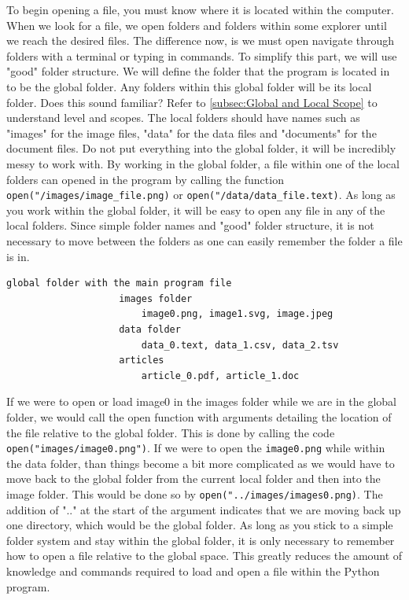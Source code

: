 \documentclass[11pt,a4paper]{book}
\begin{document}
				To begin opening a file, you must know where it is located within the computer. When we look for a file, we open folders and folders within some explorer until we reach the desired files. The difference now, is we must open navigate through folders with a terminal or typing in commands. To simplify this part, we will use "good" folder structure. We will define the folder that the program is located in to be the global folder. Any folders within this global folder will be its local folder. Does this sound familiar? Refer to \autoref{subsec:Global and Local Scope} to understand level and scopes. The local folders should have names such as "images" for the image files, "data" for the data files and "documents" for the document files. Do not put everything into the global folder, it will be incredibly messy to work with. By working in the global folder, a file within one of the local folders can opened in the program by calling the function \lstinline|open("/images/image_file.png)| or \lstinline|open("/data/data_file.text)|. As long as you work within the global folder, it will be easy to open any file in any of the local folders. Since simple folder names and "good" folder structure, it is not necessary to move between the folders as one can easily remember the folder a file is in.
				
				\begin{lstlisting}[caption= Cartoon of the directory structure]
				global folder with the main program file
					images folder
						image0.png, image1.svg, image.jpeg
					data folder
						data_0.text, data_1.csv, data_2.tsv
					articles
						article_0.pdf, article_1.doc
				\end{lstlisting}
				
				If we were to open or load image0 in the images folder while we are in the global folder, we would call the open function with arguments detailing the location of the file relative to the global folder. This is done by calling the code \lstinline|open("images/image0.png")|. If we were to open the \lstinline|image0.png| while within the data folder, than things become a bit more complicated as we would have to move back to the global folder from the current local folder and then into the image folder. This would be done so by  \lstinline|open("../images/images0.png)|. The addition of ".." at the start of the argument indicates that we are moving back up one directory, which would be the global folder. As long as you stick to a simple folder system and stay within the global folder, it is only necessary to remember how to open a file relative to the global space. This greatly reduces the amount of knowledge and commands required to load and open a file within the Python program. 
				
\end{document}
